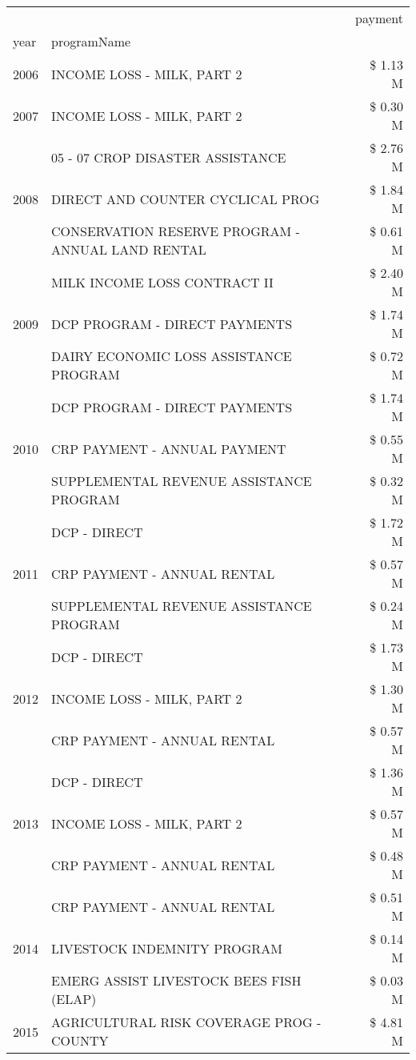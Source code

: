 \begin{tabular}{llr}
\toprule
 &  & payment \\
year & programName &  \\
\midrule
2006 & INCOME LOSS - MILK, PART 2 & \$ 1.13 M \\
\cline{1-3}
2007 & INCOME LOSS - MILK, PART 2 & \$ 0.30 M \\
\cline{1-3}
\multirow[t]{3}{*}{2008} & 05 - 07 CROP DISASTER ASSISTANCE & \$ 2.76 M \\
 & DIRECT AND COUNTER CYCLICAL PROG & \$ 1.84 M \\
 & CONSERVATION RESERVE PROGRAM - ANNUAL LAND RENTAL & \$ 0.61 M \\
\cline{1-3}
\multirow[t]{3}{*}{2009} & MILK INCOME LOSS CONTRACT II & \$ 2.40 M \\
 & DCP PROGRAM - DIRECT PAYMENTS & \$ 1.74 M \\
 & DAIRY ECONOMIC LOSS ASSISTANCE PROGRAM & \$ 0.72 M \\
\cline{1-3}
\multirow[t]{3}{*}{2010} & DCP PROGRAM - DIRECT PAYMENTS & \$ 1.74 M \\
 & CRP PAYMENT - ANNUAL PAYMENT & \$ 0.55 M \\
 & SUPPLEMENTAL REVENUE ASSISTANCE PROGRAM & \$ 0.32 M \\
\cline{1-3}
\multirow[t]{3}{*}{2011} & DCP - DIRECT & \$ 1.72 M \\
 & CRP PAYMENT - ANNUAL RENTAL & \$ 0.57 M \\
 & SUPPLEMENTAL REVENUE ASSISTANCE PROGRAM & \$ 0.24 M \\
\cline{1-3}
\multirow[t]{3}{*}{2012} & DCP - DIRECT & \$ 1.73 M \\
 & INCOME LOSS - MILK, PART 2 & \$ 1.30 M \\
 & CRP PAYMENT - ANNUAL RENTAL & \$ 0.57 M \\
\cline{1-3}
\multirow[t]{3}{*}{2013} & DCP - DIRECT & \$ 1.36 M \\
 & INCOME LOSS - MILK, PART 2 & \$ 0.57 M \\
 & CRP PAYMENT - ANNUAL RENTAL & \$ 0.48 M \\
\cline{1-3}
\multirow[t]{3}{*}{2014} & CRP PAYMENT - ANNUAL RENTAL & \$ 0.51 M \\
 & LIVESTOCK INDEMNITY PROGRAM & \$ 0.14 M \\
 & EMERG ASSIST LIVESTOCK BEES FISH (ELAP) & \$ 0.03 M \\
\cline{1-3}
\multirow[t]{3}{*}{2015} & AGRICULTURAL RISK COVERAGE PROG - COUNTY & \$ 4.81 M \\

\end{tabular}
